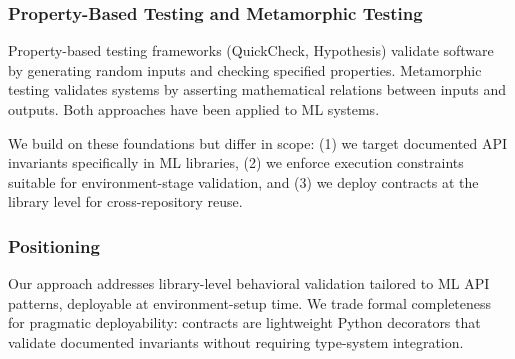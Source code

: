 \subsubsection{Property-Based Testing and Metamorphic Testing}

Property-based testing frameworks (QuickCheck, Hypothesis) validate software by generating random inputs and checking specified properties. Metamorphic testing validates systems by asserting mathematical relations between inputs and outputs. Both approaches have been applied to ML systems.

We build on these foundations but differ in scope: (1) we target documented API invariants specifically in ML libraries, (2) we enforce execution constraints suitable for environment-stage validation, and (3) we deploy contracts at the library level for cross-repository reuse.

\subsubsection{Positioning}

Our approach addresses library-level behavioral validation tailored to ML API patterns, deployable at environment-setup time. We trade formal completeness for pragmatic deployability: contracts are lightweight Python decorators that validate documented invariants without requiring type-system integration.
